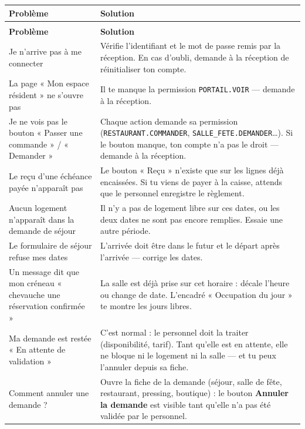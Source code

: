 \documentclass[12pt,a4paper]{article}
\begin{document}
\begin{longtable}{>{\raggedright}p{5cm} p{9cm}}
\toprule
\textbf{Problème} & \textbf{Solution} \\
\midrule
\endfirsthead
\multicolumn{2}{c}{\textit{Suite de la FAQ}} \\
\toprule
\textbf{Problème} & \textbf{Solution} \\
\midrule
\endhead
\bottomrule
\endfoot

Je n'arrive pas à me connecter & Vérifie l'identifiant et le mot de passe remis par la réception. En cas d'oubli, demande à la réception de réinitialiser ton compte. \\

La page « Mon espace résident » ne s'ouvre pas & Il te manque la permission \texttt{PORTAIL.VOIR} — demande à la réception. \\

Je ne vois pas le bouton « Passer une commande » / « Demander » & Chaque action demande sa permission (\texttt{RESTAURANT.COMMANDER}, \texttt{SALLE\_FETE.DEMANDER}…). Si le bouton manque, ton compte n'a pas le droit — demande à la réception. \\

Le reçu d'une échéance payée n'apparaît pas & Le bouton « Reçu » n'existe que sur les lignes déjà encaissées. Si tu viens de payer à la caisse, attends que le personnel enregistre le règlement. \\

Aucun logement n'apparaît dans la demande de séjour & Il n'y a pas de logement libre sur ces dates, ou les deux dates ne sont pas encore remplies. Essaie une autre période. \\

Le formulaire de séjour refuse mes dates & L'arrivée doit être dans le futur et le départ après l'arrivée — corrige les dates. \\

Un message dit que mon créneau « chevauche une réservation confirmée » & La salle est déjà prise sur cet horaire : décale l'heure ou change de date. L'encadré « Occupation du jour » te montre les jours libres. \\

Ma demande est restée « En attente de validation » & C'est normal : le personnel doit la traiter (disponibilité, tarif). Tant qu'elle est en attente, elle ne bloque ni le logement ni la salle — et tu peux l'annuler depuis sa fiche. \\

Comment annuler une demande ? & Ouvre la fiche de la demande (séjour, salle de fête, restaurant, pressing, boutique) : le bouton \textbf{Annuler la demande} est visible tant qu'elle n'a pas été validée par le personnel. \\


\end{longtable}
\end{document}
